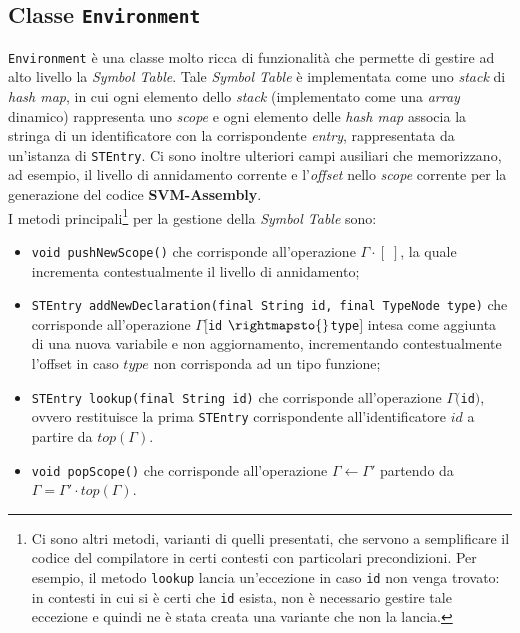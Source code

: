 \documentclass[../report.tex]{subfiles}
\begin{document}
\subsection[Classe Environment]{Classe \texttt{Environment}}\label{ss:environment}
\verb|Environment| è una classe molto ricca di funzionalità che permette di gestire ad alto livello la \textit{Symbol Table}. Tale \textit{Symbol Table} è implementata come uno \textit{stack} di \textit{hash map}, in cui ogni elemento dello \textit{stack} (implementato come una \textit{array} dinamico) rappresenta uno \textit{scope} e ogni elemento delle \textit{hash map} associa la stringa di un identificatore con la corrispondente \textit{entry}, rappresentata da un'istanza di \verb|STEntry|.
Ci sono inoltre ulteriori campi ausiliari che memorizzano, ad esempio, il livello di annidamento corrente e l'\textit{offset} nello \textit{scope} corrente per la generazione del codice \textbf{SVM-Assembly}.\\
I metodi principali\footnote{Ci sono altri metodi, varianti di quelli presentati, che servono a semplificare il codice del compilatore in certi contesti con particolari precondizioni. Per esempio, il metodo \texttt{lookup} lancia un'eccezione in caso \texttt{id} non venga trovato: in contesti in cui si è certi che \texttt{id} esista, non è necessario gestire tale eccezione e quindi ne è stata creata una variante che non la lancia.} per la gestione della \textit{Symbol Table} sono:
\begin{itemize}
    \item \verb|void pushNewScope()| che corrisponde all'operazione $\Gamma{}\cdot{}[\;]$, la quale incrementa contestualmente il livello di annidamento;
    \item \verb|STEntry addNewDeclaration(final String id, final TypeNode type)| che corrisponde all'operazione $\Gamma{}[$\verb|id| $ \rightmapsto{}$\verb|type|$]$ intesa come aggiunta di una nuova variabile e non aggiornamento, incrementando contestualmente l'offset in caso $type$ non corrisponda ad un tipo funzione;
    \item \verb|STEntry lookup(final String id)| che corrisponde all'operazione $\Gamma($\verb|id|$)$, ovvero restituisce la prima \verb|STEntry| corrispondente all'identificatore $id$ a partire da $top(\Gamma)$.
    \item \verb|void popScope()| che corrisponde all'operazione $\Gamma \leftarrow{} \Gamma'$ partendo da $\Gamma = \Gamma'\cdot{}top(\Gamma)$.
\end{itemize}
\end{document}
